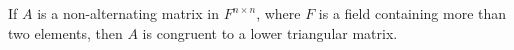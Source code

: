 If $A$ is a non-alternating matrix in $F^{n \times n}$, where $F$ is a field containing more than two elements, then $A$ is congruent to a lower triangular matrix.
